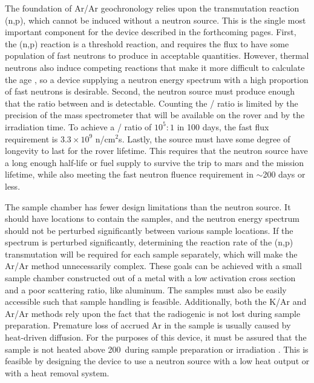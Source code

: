 \documentclass{mc2015}
\begin{document}
The foundation of Ar/Ar geochronology relies upon the transmutation reaction (n,p), which cannot be induced without a neutron source. This is the single most important component for the device described in the forthcoming pages. First, the (n,p) reaction is a threshold reaction, and requires the flux to have some population of fast neutrons to produce  in acceptable quantities. However, thermal neutrons also induce competing reactions that make it more difficult to calculate the age \cite{mcdougall_geochronology_1999}, so a device supplying a neutron energy spectrum with a high proportion of fast neutrons is desirable. Second, the neutron source must produce enough  that the ratio between  and  is detectable. Counting the / ratio is limited by the precision of the mass spectrometer that will be available on the rover and by the irradiation time. To achieve a / ratio of $10^{5}:1$ in 100 days, the fast flux requirement is $3.3\times10^9$ n/cm$^2$s. Lastly, the source must have some degree of longevity to last for the rover lifetime. This requires that the neutron source have a long enough half-life or fuel supply to survive the trip to mars and the mission lifetime, while also meeting the fast neutron fluence requirement in $\sim$200 days or less.   

The sample chamber has fewer design limitations than the neutron source. It should have locations to contain the samples, and the neutron energy spectrum should not be perturbed significantly between various sample locations. If the spectrum is perturbed significantly, determining the reaction rate of the (n,p) transmutation will be required for each sample separately, which will make the Ar/Ar method unnecessarily complex. These goals can be achieved with a small sample chamber constructed out of a metal with a low activation cross section and a poor scattering ratio, like aluminum. The samples must also be easily accessible such that sample handling is feasible. Additionally, both the K/Ar and Ar/Ar methods rely upon the fact that the radiogenic  is not lost during sample preparation. Premature loss of accrued Ar in the sample is usually caused by heat-driven diffusion. For the purposes of this device, it must be assured that the sample is not heated above 200\celsius\ during sample preparation or irradiation \cite{mcdougall_geochronology_1999}. This is feasible by designing the device to use a neutron source with a low heat output or with a heat removal system. 
\end{document}
